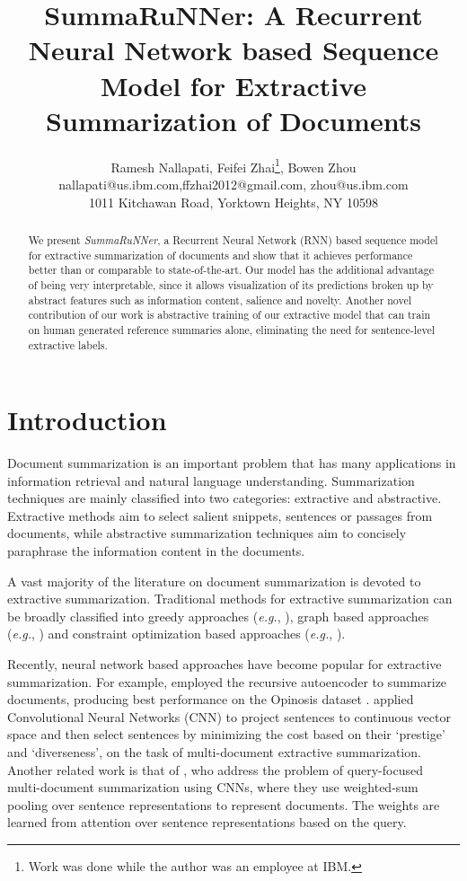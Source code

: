 \documentclass[letterpaper]{article}
\begin{document}
\title{SummaRuNNer: A Recurrent Neural Network based Sequence Model for Extractive Summarization of Documents}
\author{Ramesh Nallapati, Feifei Zhai\thanks{Work was done while the author was an employee at IBM.}, Bowen Zhou\\
nallapati@us.ibm.com,ffzhai2012@gmail.com, zhou@us.ibm.com\\
1011 Kitchawan Road, Yorktown Heights, NY 10598
}
\maketitle
\begin{abstract}
We present {\it SummaRuNNer}, a Recurrent Neural Network (RNN) based sequence model for extractive summarization of documents and show that it achieves  performance better than or comparable to state-of-the-art. Our model has the additional advantage of being very interpretable, since it allows visualization of its predictions broken up by abstract features such as information content, salience and novelty. Another novel contribution of our work is abstractive training of our extractive model that can train  on human generated reference summaries alone, eliminating the need for sentence-level extractive labels.
\end{abstract}

\section{Introduction}
Document summarization is an important problem that has many applications in information retrieval and natural language understanding. Summarization techniques are mainly classified into two categories: extractive and abstractive. Extractive methods aim to select salient snippets, sentences or passages from documents, while abstractive summarization techniques aim to concisely paraphrase the information content in the documents.


A vast majority of the literature on document summarization is devoted to extractive summarization. Traditional methods for extractive summarization can be broadly classified into greedy approaches ({\it e.g.}, \cite{carbonell:98}), graph based approaches ({\it e.g.}, \cite{erkan:04}) and constraint optimization based approaches ({\it e.g.}, \cite{McDonald:07}). 

Recently, neural network based approaches have become popular for extractive summarization.  For example,
\cite{Kageback:14} employed the recursive autoencoder \cite{Socher:11} to summarize documents, producing best performance on the Opinosis dataset \cite{ganesan:10}. \cite{yin:15} applied Convolutional Neural Networks (CNN) to project sentences to continuous vector space and then select sentences by minimizing the cost based on their `prestige' and `diverseness', on the task of multi-document extractive summarization. Another related work is that of \cite{cao:16}, who address the problem of query-focused multi-document summarization using CNNs, where they use weighted-sum pooling over sentence representations to represent documents. The weights are learned from attention over sentence representations based on the query. 
\end{document}
